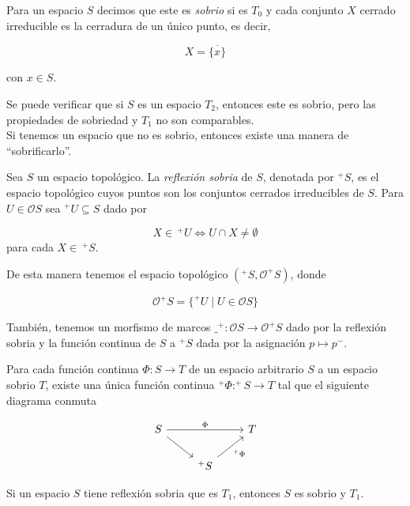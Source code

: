 \begin{dfn}\label{sobrio}
    Para un espacio $S$ decimos que este es \emph{sobrio} si es $T_0$ y cada conjunto $X$ cerrado irreducible es la cerradura de un único punto, es decir,

    \[
    X=\overline{\{x\}}
    \]

    con $x\in S$.
\end{dfn}

Se puede verificar que si $S$ es un espacio $T_2$, entonces este es sobrio, pero las propiedades de sobriedad y $T_1$ no son comparables.\\

Si tenemos un espacio que no es sobrio, entonces existe una manera de ``sobrificarlo''.

\begin{dfn}\label{Reflexion sobria}
    Sea $S$ un espacio topológico. La \emph{reflexión sobria} de $S$, denotada por $^+S$, es el espacio topológico cuyos puntos son los conjuntos cerrados irreducibles de $S$. Para $U\in \mathcal{O}S$ sea $^+U\subseteq S$ dado por 

    \[
    X\in\, ^+U \Leftrightarrow U\cap X\neq \emptyset
    \]
para cada $X\in\,^+S$. 
\end{dfn}

De esta manera tenemos el espacio topológico $(^+S, \mathcal{O}^+S)$, donde 

\[
\mathcal{O}^+S=\{^+U\mid U\in \mathcal{O}S\}
\]

También, tenemos un morfismo de marcos $\_ ^+\colon \mathcal{O}S\to \mathcal{O} ^+S$ dado por la reflexión sobria y la función continua de $S$ a $^+S$ dada por la asignación $p\mapsto p^-$.

\begin{lem}
    Para cada función continua $\Phi\colon S\to T$ de un espacio arbitrario $S$ a un espacio sobrio $T$, existe una única función continua $^+\Phi\colon ^+S\to T$ tal que el siguiente diagrama conmuta

    \[\begin{tikzcd}
	S && T \\
	& {^+S}
	\arrow["\Phi", from=1-1, to=1-3]
	\arrow[from=1-1, to=2-2]
	\arrow["{^+\Phi}"', from=2-2, to=1-3]
\end{tikzcd}\]
\end{lem}

\begin{lem}
    Si un espacio $S$ tiene reflexión sobria que es $T_1$, entonces $S$ es sobrio y $T_1$.
\end{lem}


